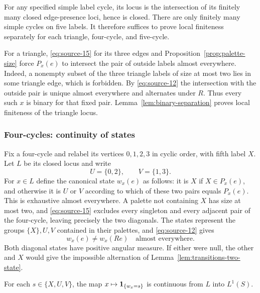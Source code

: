 For any specified simple label cycle, its locus is the intersection
of its finitely many closed edge-presence loci, hence is closed.
There are only finitely many simple cycles on five labels.  It
therefore suffices to prove local finiteness separately for each
triangle, four-cycle, and five-cycle.

For a triangle, \eqref{eq:source-15} for its three edges and
Proposition~\ref{prop:palette-size} force $P_x(e)$ to intersect the
pair of outside labels almost everywhere.  Indeed, a nonempty subset
of the three triangle labels of size at most two lies in some
triangle edge, which is forbidden.  By \eqref{eq:source-12} the
intersection with the outside pair is unique almost everywhere and
alternates under $R$.  Thus every such $x$ is binary for that fixed
pair.  Lemma~\ref{lem:binary-separation} proves local finiteness of
the triangle locus.

\subsubsection{Four-cycles: continuity of states}

Fix a four-cycle and relabel its vertices $0,1,2,3$ in cyclic order,
with fifth label $X$.  Let $L$ be its closed locus and write
\[
 U=\{0,2\},\qquad V=\{1,3\}.
\]
For $x\in L$ define the canonical state $w_x(e)$ as follows: it is
$X$ if $X\in P_x(e)$, and otherwise it is $U$ or $V$ according to
which of these two pairs equals $P_x(e)$.  This is exhaustive almost
everywhere.  A palette not containing $X$ has size at most two, and
\eqref{eq:source-15} excludes every singleton and every adjacent pair
of the four-cycle, leaving precisely the two diagonals.  The states
represent the groups $\{X\},U,V$ contained in their palettes, and
\eqref{eq:source-12} gives
\[
 w_x(e)\ne w_x(Re)\quad\text{almost everywhere}.
\]
Both diagonal states have positive angular measure.  If either were
null, the other and $X$ would give the impossible alternation of
Lemma~\ref{lem:transitions-two-state}.

\begin{lemma}
\label{lem:transitions-four-continuity}
For each $s\in\{X,U,V\}$, the map
$x\mapsto\mathbf 1_{\{w_x=s\}}$ is continuous from $L$ into $L^1(S)$.
\end{lemma}

